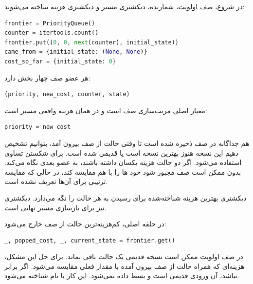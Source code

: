 \documentclass[10.5pt]{exam}
\begin{document}
در شروع، صف اولویت، شمارنده، دیکشنری مسیر و دیکشنری هزینه ساخته می‌شوند:

\begin{latin}
\begin{lstlisting}[language=Python]
frontier = PriorityQueue()
counter = itertools.count()
frontier.put((0, 0, next(counter), initial_state))
came_from = {initial_state: (None, None)}
cost_so_far = {initial_state: 0}
\end{lstlisting}
\end{latin}

هر عضو صف چهار بخش دارد:

\begin{latin}
\begin{lstlisting}[language=Python]
(priority, new_cost, counter, state)
\end{lstlisting}
\end{latin}

معیار اصلی مرتب‌سازی صف است و در
همان هزینه واقعی مسیر است:

\begin{latin}
\begin{lstlisting}[language=Python]
priority = new_cost
\end{lstlisting}
\end{latin}

هم جداگانه در صف ذخیره شده است تا وقتی حالت از صف بیرون آمد، بتوانیم تشخیص دهیم این نسخه هنوز بهترین نسخه است یا قدیمی شده است.
برای شکستن تساوی استفاده می‌شود. اگر دو حالت هزینه یکسان داشته باشند،
به عضو بعدی نگاه می‌کند. بدون
ممکن است صف مجبور شود خود
ها را با هم مقایسه کند، در حالی که مقایسه ترتیبی برای آن‌ها تعریف نشده است.

دیکشنری
بهترین هزینه شناخته‌شده برای رسیدن به هر حالت را نگه می‌دارد. دیکشنری
نیز برای بازسازی مسیر نهایی است.

در حلقه اصلی، کم‌هزینه‌ترین حالت از صف خارج می‌شود:

\begin{latin}
\begin{lstlisting}[language=Python]
_, popped_cost, _, current_state = frontier.get()
\end{lstlisting}
\end{latin}

در صف اولویت ممکن است نسخه قدیمی یک حالت باقی بماند. برای حل این مشکل، هزینه‌ای که همراه حالت از صف بیرون آمده با مقدار فعلی
مقایسه می‌شود. اگر برابر نباشد، آن ورودی قدیمی است و بسط داده نمی‌شود. این کار با نام
شناخته می‌شود.
\end{document}
